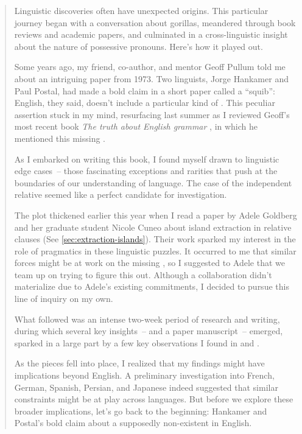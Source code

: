 \begin{quote}




Linguistic discoveries often have unexpected origins. This particular journey began with a conversation about gorillas, meandered through book reviews and academic papers, and culminated in a cross-linguistic insight about the nature of possessive pronouns. Here's how it played out.

Some years ago, my friend, co-author, and mentor Geoff Pullum told me about an intriguing paper from 1973. Two linguists, Jorge Hankamer and Paul Postal, had made a bold claim in a short paper called a \enquote{squib}: English, they said, doesn't include a particular kind of . This peculiar assertion stuck in my mind, resurfacing last summer as I reviewed Geoff's most recent book \textit{The truth about English grammar} \citep{pullum2024truth}, in which he mentioned this missing .

As I embarked on writing this book, I found myself drawn to linguistic edge cases~-- those fascinating exceptions and rarities that push at the boundaries of our understanding of language. The case of the independent relative  seemed like a perfect candidate for investigation.

The plot thickened earlier this year when I read a paper by Adele Goldberg and her graduate student Nicole Cuneo \citep{Cuneo2023} about island extraction in relative clauses (See \ref{sec:extraction-islands}). Their work sparked my interest in the role of pragmatics in these linguistic puzzles. It occurred to me that similar forces might be at work on the missing , so I suggested to Adele that we team up on trying to figure this out. Although a collaboration didn't materialize due to Adele's existing commitments, I decided to pursue this line of inquiry on my own.

What followed was an intense two-week period of research and writing, during which several key insights~-- and a paper manuscript~-- emerged, sparked in a large part by a few key observations I found in \citet{Halliday1976cohesion} and \citet{Ariel2014}.

As the pieces fell into place, I realized that my findings might have implications beyond English. A preliminary investigation into French, German, Spanish, Persian, and Japanese indeed suggested that similar constraints might be at play across languages. But before we explore these broader implications, let's go back to the beginning: Hankamer and Postal's bold claim about a supposedly non-existent  in English.
\end{quote}

